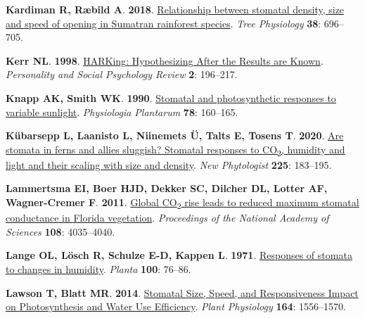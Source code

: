 \documentclass[
  letterpaper,
  DIV=11,
  numbers=noendperiod]{scrartcl}
\newlength{\cslhangindent}
\newenvironment{CSLReferences}[2] %
 {\begin{list}{}{%
  \setlength{\itemindent}{0pt}
  \setlength{\leftmargin}{0pt}
  \setlength{\parsep}{0pt}
  \ifodd #1
   \setlength{\leftmargin}{\cslhangindent}
   \setlength{\itemindent}{-1\cslhangindent}
  \fi
  \setlength{\itemsep}{#2\baselineskip}}}
 {\end{list}}
\providecommand{\DIFaddend}{} %
\DeclareRobustCommand{\DIFaddend}{\DIFOaddend \let\includegraphics\DIFOincludegraphics} %
\begin{document}
\begin{CSLReferences}{0}{1}
\DIFaddend {}
\textbf{\textbf{Kardiman R}, \textbf{Ræbild A}}. \textbf{2018}.
\href{https://doi.org/10.1093/treephys/tpx149}{Relationship between
stomatal density, size and speed of opening in {Sumatran} rainforest
species}. \emph{Tree Physiology} \textbf{38}: 696--705.

\textbf{\textbf{Kerr NL}}. \textbf{1998}.
\href{https://doi.org/10.1207/s15327957pspr0203_4}{{HARKing}:
{Hypothesizing After} the {Results} are {Known}}. \emph{Personality and
Social Psychology Review} \textbf{2}: 196--217.

\textbf{\textbf{Knapp AK}, \textbf{Smith WK}}. \textbf{1990}.
\href{https://doi.org/10.1111/j.1399-3054.1990.tb08731.x}{Stomatal and
photosynthetic responses to variable sunlight}. \emph{Physiologia
Plantarum} \textbf{78}: 160--165.

\textbf{\textbf{Kübarsepp L}, \textbf{Laanisto L}, \textbf{Niinemets Ü},
\textbf{Talts E}, \textbf{Tosens T}}. \textbf{2020}.
\href{https://doi.org/10.1111/nph.16159}{Are stomata in ferns and allies
sluggish? {Stomatal} responses to {CO}{\textsubscript{2}}, humidity and
light and their scaling with size and density}. \emph{New Phytologist}
\textbf{225}: 183--195.

\textbf{\textbf{Lammertsma EI}, \textbf{Boer HJD}, \textbf{Dekker SC},
\textbf{Dilcher DL}, \textbf{Lotter AF}, \textbf{Wagner-Cremer F}}.
\textbf{2011}. \href{https://doi.org/10.1073/pnas.1100371108}{Global
{CO}{\textsubscript{2}} rise leads to reduced maximum stomatal
conductance in {Florida} vegetation}. \emph{Proceedings of the National
Academy of Sciences} \textbf{108}: 4035--4040.

\textbf{\textbf{Lange OL}, \textbf{Lösch R}, \textbf{Schulze E-D},
\textbf{Kappen L}}. \textbf{1971}.
\href{https://doi.org/10.1007/BF00386887}{Responses of stomata to
changes in humidity}. \emph{Planta} \textbf{100}: 76--86.

\textbf{\textbf{Lawson T}, \textbf{Blatt MR}}. \textbf{2014}.
\href{https://doi.org/10.1104/pp.114.237107}{Stomatal {Size}, {Speed},
and {Responsiveness Impact} on {Photosynthesis} and {Water Use
Efficiency}}. \emph{Plant Physiology} \textbf{164}: 1556--1570.


\end{CSLReferences}
\end{document}

